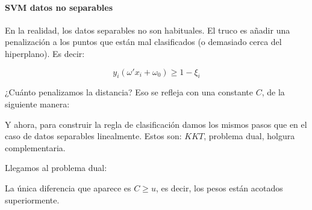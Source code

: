 \paragraph{SVM datos no separables}

En la realidad, los datos separables no son habituales. 
%
El truco es añadir una penalización a los puntos que están mal clasificados (o demasiado cerca del hiperplano). Es decir:

\[
	y_i(ω'x_i + ω_0) ≥ 1-\xi_i
\]

¿Cuánto penalizamos la distancia? Eso se refleja con una constante $C$, de la siguiente manera:

\begin{ioprob}
\end{ioprob}

Y ahora, para construir la regla de clasificación damos los mismos pasos que en el caso de datos separables linealmente. 
%
Estos son: $KKT$, problema dual, holgura complementaria.


Llegamos al problema dual:


\begin{ioprob}
\end{ioprob}

La única diferencia que aparece es $C≥u$, es decir, los pesos están acotados superiormente.
